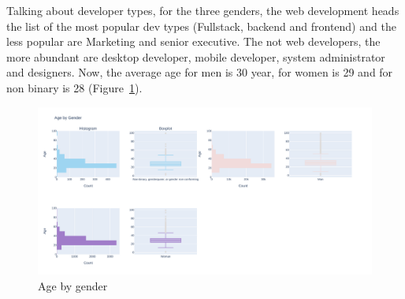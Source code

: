 \documentclass{article}
\begin{document}
\clearpage 
Talking about developer types, for the three genders, the web development heads the list of the most popular dev types (Fullstack, backend and frontend) and the less popular are Marketing and senior executive. The not web developers, the more abundant are desktop developer, mobile developer, system administrator and designers.
Now, the average age for men is 30 year, for women is 29 and for non binary is 28 (Figure~\ref{fig:agebygender}).
\begin{figure}[ht]
    \centering
    \includegraphics[width=1.1\textwidth]{images/agebygender.pdf}
    \caption{Age by gender}
    \label{fig:agebygender}
\end{figure}{}
\end{document}
